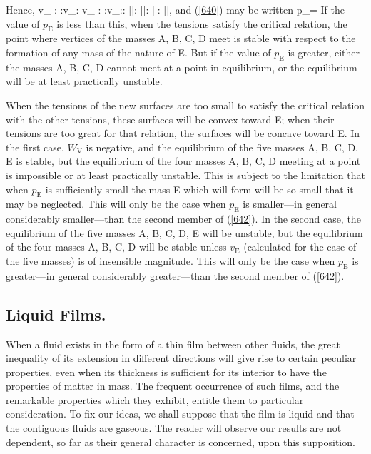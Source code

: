 \documentclass[12pt]{article}
\begin{document}
Hence,
\eqs v_ : :v_: v_ : :v_:: []: []: []: [],    \label{641}\eqe
and (\ref{640}) may be written
\eqs p_=   \label{642}\eqe
If the value of $p_\text{E}$ is less than this, when the tensions satisfy the critical relation, the point where vertices of the masses A, B, C, D meet is stable with respect to the formation of any mass of the nature of E. But if the value of $p_\text{E}$ is greater, either the masses A, B, C, D cannot meet at a point in equilibrium, or the equilibrium will be at least practically unstable.

When the tensions of the new surfaces are too small to satisfy the critical relation with the other tensions, these surfaces will be convex toward E; when their tensions are too great for that relation, the surfaces will be concave toward E. In the first case, $W_\text{V}$ is negative, and the equilibrium of the five masses A, B, C, D, E is stable, but the equilibrium of the four masses A, B, C, D meeting at a point is impossible or at least practically unstable.  This is subject to the limitation that when $p_\text{E}$ is sufficiently small the mass E which will form will be so small that it may be neglected. This will only be the case when $p_\text{E}$ is smaller---in general considerably smaller---than the second member of (\ref{642}). In the second case, the equilibrium of the five masses A, B, C, D, E will be unstable, but the equilibrium of the four masses A, B, C, D will be stable unless $v_\text{E}$ (calculated for the case of the five masses) is of insensible magnitude. This will only be the case when $p_\text{E}$ is greater---in general considerably greater---than the second member of (\ref{642}).
\subsection{Liquid Films.}
When a fluid exists in the form of a thin film between other fluids, the great inequality of its extension in different directions will give rise to certain peculiar properties, even when its thickness is sufficient for its interior to have the properties of matter in mass. The frequent occurrence of such films, and the remarkable properties which they exhibit, entitle them to particular consideration. To fix our ideas, we shall suppose that the film is liquid and that the contiguous fluids are gaseous. The reader will observe our results are not dependent, so far as their general character is concerned, upon this supposition.
\end{document}
